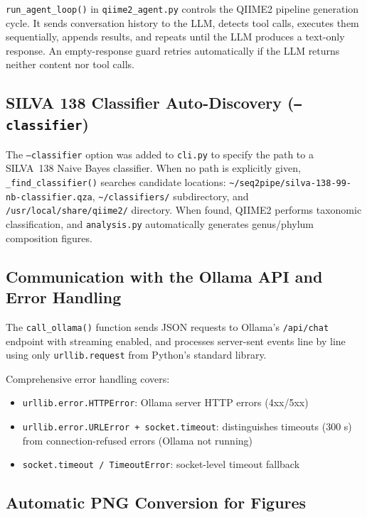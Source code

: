 \documentclass[12pt, a4paper]{article}
\begin{document}
\texttt{run\_agent\_loop()} in \texttt{qiime2\_agent.py} controls
the QIIME2 pipeline generation cycle.
It sends conversation history to the LLM, detects tool calls,
executes them sequentially, appends results, and repeats until
the LLM produces a text-only response.
An empty-response guard retries automatically if the LLM returns
neither content nor tool calls.

\subsection{SILVA 138 Classifier Auto-Discovery (\texttt{--classifier})}

The \texttt{--classifier} option was added to \texttt{cli.py} to specify
the path to a SILVA~138 Naive Bayes classifier.
When no path is explicitly given, \texttt{\_find\_classifier()} searches
candidate locations:
\texttt{\textasciitilde/seq2pipe/silva-138-99-nb-classifier.qza},
\texttt{\textasciitilde/classifiers/} subdirectory, and
\texttt{/usr/local/share/qiime2/} directory.
When found, QIIME2 performs taxonomic classification, and
\texttt{analysis.py} automatically generates genus/phylum composition figures.

\subsection{Communication with the Ollama API and Error Handling}

The \texttt{call\_ollama()} function sends JSON requests to Ollama's
\texttt{/api/chat} endpoint with streaming enabled, and processes
server-sent events line by line using only \texttt{urllib.request}
from Python's standard library.

Comprehensive error handling covers:
\begin{itemize}
  \item \texttt{urllib.error.HTTPError}: Ollama server HTTP errors (4xx/5xx)
  \item \texttt{urllib.error.URLError + socket.timeout}:
    distinguishes timeouts (300 s) from connection-refused errors
    (Ollama not running)
  \item \texttt{socket.timeout / TimeoutError}:
    socket-level timeout fallback
\end{itemize}

\subsection{Automatic PNG Conversion for Figures}
\end{document}
